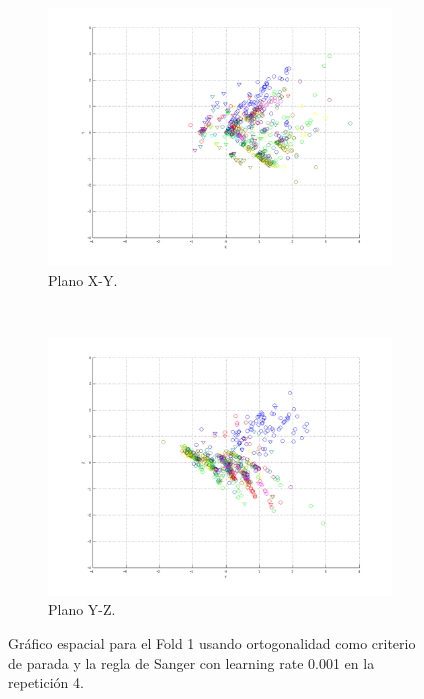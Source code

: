 \documentclass[informe.tex]{subfiles}
\begin{document}
\begin{figure}[H]
        \hspace*{-6.5cm}
        \begin{subfigure}[b]{0.49\textwidth}
                \includegraphics[width=\textwidth]{graficos/fold1_criterioParadao_reglas_alpha0_rep4_2XY.png}
                \caption{Plano X-Y.}
        \end{subfigure}
        ~
        \begin{subfigure}[b]{0.49\textwidth}
                \includegraphics[width=\textwidth]{graficos/fold1_criterioParadao_reglas_alpha0_rep4_3YZ.png}
                \caption{Plano Y-Z.}
        \end{subfigure}
	\restoregeometry
        \caption{Gráfico espacial para el Fold 1 usando ortogonalidad como criterio de parada y la regla de Sanger con learning rate 0.001 en la repetición 4.}
        \label{fig:fold1_criterioParadao_reglas_alpha0_rep4}
	\end{figure}
      
\end{document}
